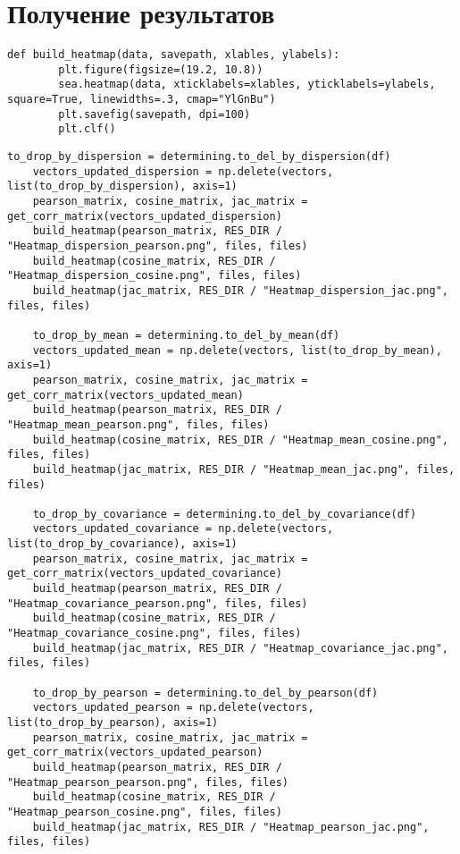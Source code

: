 \section{Получение результатов}

\begin{lstlisting}[label=build_heatmaps, caption={Построение тепловых карт}]
    def build_heatmap(data, savepath, xlables, ylabels):
        plt.figure(figsize=(19.2, 10.8))
        sea.heatmap(data, xticklabels=xlables, yticklabels=ylabels, square=True, linewidths=.3, cmap="YlGnBu")
        plt.savefig(savepath, dpi=100)
        plt.clf()
\end{lstlisting}

\begin{lstlisting}[label=get_res, caption={Внесение измений и построение тепловых карт}]
    to_drop_by_dispersion = determining.to_del_by_dispersion(df)
    vectors_updated_dispersion = np.delete(vectors, list(to_drop_by_dispersion), axis=1)
    pearson_matrix, cosine_matrix, jac_matrix = get_corr_matrix(vectors_updated_dispersion)
    build_heatmap(pearson_matrix, RES_DIR / "Heatmap_dispersion_pearson.png", files, files)
    build_heatmap(cosine_matrix, RES_DIR / "Heatmap_dispersion_cosine.png", files, files)
    build_heatmap(jac_matrix, RES_DIR / "Heatmap_dispersion_jac.png", files, files)

    to_drop_by_mean = determining.to_del_by_mean(df)
    vectors_updated_mean = np.delete(vectors, list(to_drop_by_mean), axis=1)
    pearson_matrix, cosine_matrix, jac_matrix = get_corr_matrix(vectors_updated_mean)
    build_heatmap(pearson_matrix, RES_DIR / "Heatmap_mean_pearson.png", files, files)
    build_heatmap(cosine_matrix, RES_DIR / "Heatmap_mean_cosine.png", files, files)
    build_heatmap(jac_matrix, RES_DIR / "Heatmap_mean_jac.png", files, files)

    to_drop_by_covariance = determining.to_del_by_covariance(df)
    vectors_updated_covariance = np.delete(vectors, list(to_drop_by_covariance), axis=1)
    pearson_matrix, cosine_matrix, jac_matrix = get_corr_matrix(vectors_updated_covariance)
    build_heatmap(pearson_matrix, RES_DIR / "Heatmap_covariance_pearson.png", files, files)
    build_heatmap(cosine_matrix, RES_DIR / "Heatmap_covariance_cosine.png", files, files)
    build_heatmap(jac_matrix, RES_DIR / "Heatmap_covariance_jac.png", files, files)

    to_drop_by_pearson = determining.to_del_by_pearson(df)
    vectors_updated_pearson = np.delete(vectors, list(to_drop_by_pearson), axis=1)
    pearson_matrix, cosine_matrix, jac_matrix = get_corr_matrix(vectors_updated_pearson)
    build_heatmap(pearson_matrix, RES_DIR / "Heatmap_pearson_pearson.png", files, files)
    build_heatmap(cosine_matrix, RES_DIR / "Heatmap_pearson_cosine.png", files, files)
    build_heatmap(jac_matrix, RES_DIR / "Heatmap_pearson_jac.png", files, files)


\end{lstlisting}
